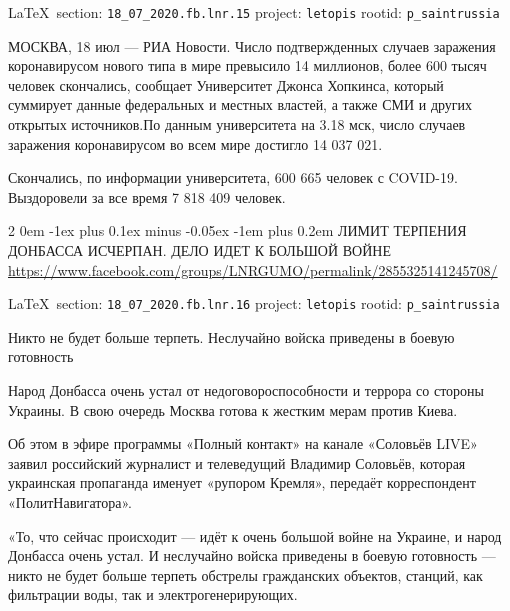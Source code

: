 \documentclass[a4paper,11pt]{extreport}
\makeatletter
\renewcommand\subsection{%
  \clearpage
    \@startsection{subsection}%
    {2}%
    {0em}%
    {-1ex plus 0.1ex minus -0.05ex}%
    {-1em plus 0.2em}%
    {\scshape\bfseries\Large}%
}
\makeatother
\begin{document}
  
\vspace{0.5cm}
{\small\LaTeX~section: \verb|18_07_2020.fb.lnr.15| project: \verb|letopis| rootid: \verb|p_saintrussia|}
\vspace{0.5cm}

МОСКВА, 18 июл --- РИА Новости.  Число подтвержденных случаев заражения
коронавирусом нового типа в мире превысило 14 миллионов, более 600 тысяч
человек скончались, сообщает Университет Джонса Хопкинса, который суммирует
данные федеральных и местных властей, а также СМИ и других открытых
источников.По данным университета на 3.18 мск, число случаев заражения
коронавирусом во всем мире достигло 14 037 021.

Скончались, по информации университета, 600 665 человек с COVID-19. Выздоровели
за все время 7 818 409 человек. 
 
 

\subsection{ЛИМИТ ТЕРПЕНИЯ ДОНБАССА ИСЧЕРПАН. ДЕЛО ИДЕТ К БОЛЬШОЙ ВОЙНЕ}
\label{sec:18_07_2020.fb.lnr.16}
\url{https://www.facebook.com/groups/LNRGUMO/permalink/2855325141245708/}
  
\vspace{0.5cm}
{\small\LaTeX~section: \verb|18_07_2020.fb.lnr.16| project: \verb|letopis| rootid: \verb|p_saintrussia|}
\vspace{0.5cm}

Никто не будет больше терпеть. Неслучайно войска приведены в боевую готовность

Народ Донбасса очень устал от недоговороспособности и террора со стороны Украины.
В свою очередь Москва готова к жестким мерам против Киева.

Об этом в эфире программы «Полный контакт» на канале «Соловьёв LIVE» заявил российский журналист и телеведущий Владимир Соловьёв, которая украинская пропаганда именует «рупором Кремля», передаёт корреспондент «ПолитНавигатора».

«То, что сейчас происходит --- идёт к очень большой войне на Украине, и народ Донбасса очень устал.
И неслучайно войска приведены в боевую готовность --- никто не будет больше терпеть обстрелы гражданских объектов, станций, как фильтрации воды, так и электрогенерирующих.
\end{document}
